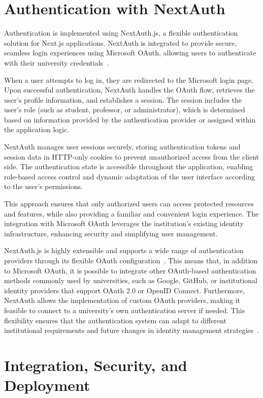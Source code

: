 \section{Authentication with NextAuth}

Authentication is implemented using NextAuth.js, a flexible authentication solution for Next.js applications. NextAuth is integrated to provide secure, seamless login experiences using Microsoft OAuth, allowing users to authenticate with their university credentials~\cite{nextjs-authentication}.

When a user attempts to log in, they are redirected to the Microsoft login page. Upon successful authentication, NextAuth handles the OAuth flow, retrieves the user's profile information, and establishes a session. The session includes the user's role (such as student, professor, or administrator), which is determined based on information provided by the authentication provider or assigned within the application logic.

NextAuth manages user sessions securely, storing authentication tokens and session data in HTTP-only cookies to prevent unauthorized access from the client side. The authentication state is accessible throughout the application, enabling role-based access control and dynamic adaptation of the user interface according to the user's permissions.

This approach ensures that only authorized users can access protected resources and features, while also providing a familiar and convenient login experience. The integration with Microsoft OAuth leverages the institution's existing identity infrastructure, enhancing security and simplifying user management.

NextAuth.js is highly extensible and supports a wide range of authentication providers through its flexible OAuth configuration~\cite{nextjs-authentication}. This means that, in addition to Microsoft OAuth, it is possible to integrate other OAuth-based authentication methods commonly used by universities, such as Google, GitHub, or institutional identity providers that support OAuth 2.0 or OpenID Connect. Furthermore, NextAuth allows the implementation of custom OAuth providers, making it feasible to connect to a university's own authentication server if needed. This flexibility ensures that the authentication system can adapt to different institutional requirements and future changes in identity management strategies~\cite{nextjs-authentication}.

\section{Integration, Security, and Deployment}


